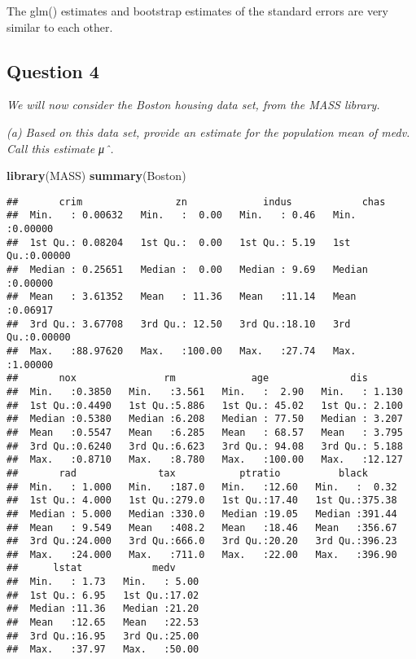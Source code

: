 \documentclass[]{article}
\newenvironment{Shaded}{\begin{snugshade}}{\end{snugshade}}
\newcommand{\KeywordTok}[1]{\textcolor[rgb]{0.13,0.29,0.53}{\textbf{#1}}}
\newcommand{\NormalTok}[1]{#1}
\begin{document}
The glm() estimates and bootstrap estimates of the standard errors are
very similar to each other.

\subsection{Question 4}\label{question-4}

 \emph{We will now consider the Boston housing data set, from the MASS
library.}

\emph{(a) Based on this data set, provide an estimate for the population
mean of medv. Call this estimate μˆ. }

\begin{Shaded}
\begin{Highlighting}[]
\KeywordTok{library}\NormalTok{(MASS)}
\KeywordTok{summary}\NormalTok{(Boston)}
\end{Highlighting}
\end{Shaded}

\begin{verbatim}
##       crim                zn             indus            chas        
##  Min.   : 0.00632   Min.   :  0.00   Min.   : 0.46   Min.   :0.00000  
##  1st Qu.: 0.08204   1st Qu.:  0.00   1st Qu.: 5.19   1st Qu.:0.00000  
##  Median : 0.25651   Median :  0.00   Median : 9.69   Median :0.00000  
##  Mean   : 3.61352   Mean   : 11.36   Mean   :11.14   Mean   :0.06917  
##  3rd Qu.: 3.67708   3rd Qu.: 12.50   3rd Qu.:18.10   3rd Qu.:0.00000  
##  Max.   :88.97620   Max.   :100.00   Max.   :27.74   Max.   :1.00000  
##       nox               rm             age              dis        
##  Min.   :0.3850   Min.   :3.561   Min.   :  2.90   Min.   : 1.130  
##  1st Qu.:0.4490   1st Qu.:5.886   1st Qu.: 45.02   1st Qu.: 2.100  
##  Median :0.5380   Median :6.208   Median : 77.50   Median : 3.207  
##  Mean   :0.5547   Mean   :6.285   Mean   : 68.57   Mean   : 3.795  
##  3rd Qu.:0.6240   3rd Qu.:6.623   3rd Qu.: 94.08   3rd Qu.: 5.188  
##  Max.   :0.8710   Max.   :8.780   Max.   :100.00   Max.   :12.127  
##       rad              tax           ptratio          black       
##  Min.   : 1.000   Min.   :187.0   Min.   :12.60   Min.   :  0.32  
##  1st Qu.: 4.000   1st Qu.:279.0   1st Qu.:17.40   1st Qu.:375.38  
##  Median : 5.000   Median :330.0   Median :19.05   Median :391.44  
##  Mean   : 9.549   Mean   :408.2   Mean   :18.46   Mean   :356.67  
##  3rd Qu.:24.000   3rd Qu.:666.0   3rd Qu.:20.20   3rd Qu.:396.23  
##  Max.   :24.000   Max.   :711.0   Max.   :22.00   Max.   :396.90  
##      lstat            medv      
##  Min.   : 1.73   Min.   : 5.00  
##  1st Qu.: 6.95   1st Qu.:17.02  
##  Median :11.36   Median :21.20  
##  Mean   :12.65   Mean   :22.53  
##  3rd Qu.:16.95   3rd Qu.:25.00  
##  Max.   :37.97   Max.   :50.00
\end{verbatim}
\end{document}
